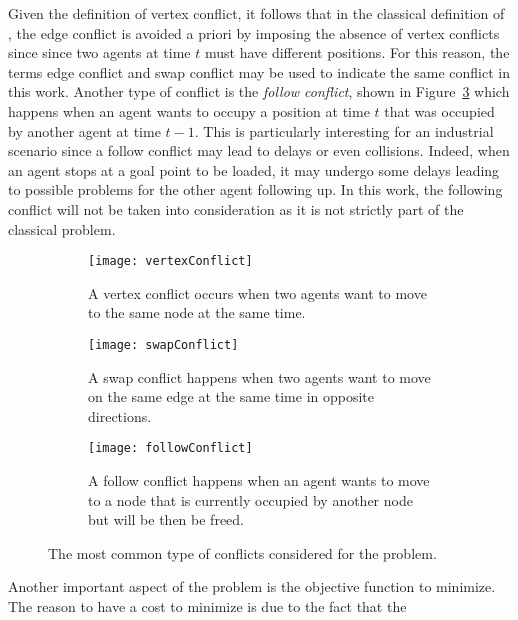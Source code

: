 Given the definition of vertex conflict, it follows that in the classical
definition of , the edge conflict is avoided a priori by imposing
the absence of vertex conflicts since since two agents at time $t$ must have
different positions. For this reason, the terms edge conflict and swap conflict
may be used to indicate the same conflict in this work. \newline
Another type of conflict is the \textit{follow conflict}, shown in
Figure~\ref{fig:followConflict} which happens when an agent wants to occupy a
position at time $t$ that was occupied by another agent at time $t-1$. This
is particularly interesting for an industrial scenario since a follow conflict
may lead to delays or even collisions. Indeed, when an agent stops at a goal
point to be loaded, it may undergo some delays leading to possible problems for
the other agent following up. In this work, the following conflict will not be
taken into consideration as it is not strictly part of the classical
 problem.
\begin{figure}[tb]
  \centering
  \begin{subfigure}[t]{0.3\linewidth}
    \centering
    \texttt{[image: vertexConflict]}
    \caption{A vertex conflict occurs when two agents want to move to the same
    node at the same time.}
    \label{fig:vertexConflict}
  \end{subfigure}
  \hfill{}
  \begin{subfigure}[t]{0.3\linewidth}
    \centering
    \texttt{[image: swapConflict]}
    \caption{A swap conflict happens when two agents want to move on the same
    edge at the same time in opposite directions.}
    \label{fig:swapConflict}
  \end{subfigure}
  \hfill{}
  \begin{subfigure}[t]{0.3\linewidth}
    \centering
    \texttt{[image: followConflict]}
    \caption{A follow conflict happens when an agent wants to move to a node
    that is currently occupied by another node but will be then be freed.}
    \label{fig:followConflict}
  \end{subfigure}
  \caption{The most common type of conflicts considered for the 
  problem.}
  \label{fig:conflicts}
\end{figure} \newline
Another important aspect of the  problem is the objective function
to minimize. The reason to have a cost to minimize is due to the fact that the
